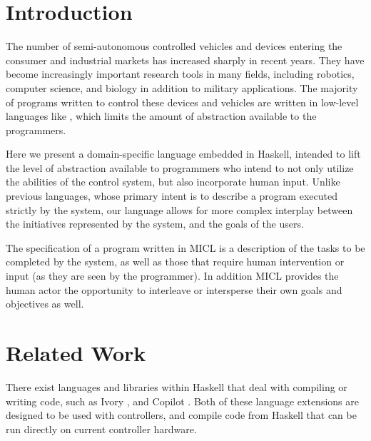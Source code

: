 \documentclass{sig-alternate-05-2015}
\begin{document}

\printccsdesc


\section{Introduction}
\label{sec:intro}
The number of semi-autonomous controlled vehicles and devices entering the
consumer and industrial markets has increased sharply in recent years. They
have become increasingly important research tools in many fields, including
robotics, computer science, and biology in addition to military
applications. The majority of programs written to control these devices and
vehicles are written in low-level languages like , which limits the
amount of abstraction available to the programmers.

Here we present a domain-specific language embedded in Haskell, intended to
lift the level of abstraction available to programmers who intend to not only
utilize the abilities of the control system, but also incorporate human
input. Unlike previous languages, whose primary intent is to describe a
program executed strictly by the system, our language allows for more complex
interplay between the initiatives represented by the system, and the goals
of the users.

The specification of a program written in MICL is a description of the
tasks to be completed by the system, as well as those that require human
intervention or input (as they are seen by the programmer). In addition
MICL provides the human actor the opportunity to interleave or
intersperse their own goals and objectives as well.


\section{Related Work}
\label{sec:related}
There exist languages and libraries within Haskell that deal with compiling or
writing  code, such as Ivory \cite{elliot2015ivory}, and Copilot
\cite{pike2010copilot}. Both of these language extensions are designed to be
used with controllers, and compile  code from Haskell that can be
run directly on current controller hardware.
\end{document}
